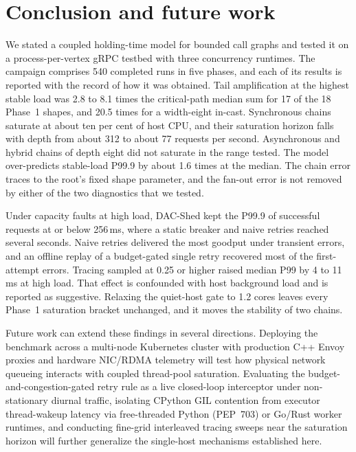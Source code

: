 \section{Conclusion and future work}
\label{sec:conclusion}

We stated a coupled holding-time model for bounded call graphs and tested it on a process-per-vertex gRPC testbed with three concurrency runtimes. The campaign comprises 540 completed runs in five phases, and each of its results is reported with the record of how it was obtained. Tail amplification at the highest stable load was 2.8 to 8.1 times the critical-path median sum for 17 of the 18 Phase~1 shapes, and 20.5 times for a width-eight in-cast. Synchronous chains saturate at about ten per cent of host CPU, and their saturation horizon falls with depth from about 312 to about 77 requests per second. Asynchronous and hybrid chains of depth eight did not saturate in the range tested. The model over-predicts stable-load P99.9 by about 1.6 times at the median. The chain error traces to the root's fixed shape parameter, and the fan-out error is not removed by either of the two diagnostics that we tested.

Under capacity faults at high load, DAC-Shed kept the P99.9 of successful requests at or below 256\,ms, where a static breaker and naive retries reached several seconds. Naive retries delivered the most goodput under transient errors, and an offline replay of a budget-gated single retry recovered most of the first-attempt errors. Tracing sampled at 0.25 or higher raised median P99 by 4 to 11\,ms at high load. That effect is confounded with host background load and is reported as suggestive. Relaxing the quiet-host gate to 1.2 cores leaves every Phase~1 saturation bracket unchanged, and it moves the stability of two chains.

Future work can extend these findings in several directions. Deploying the benchmark across a multi-node Kubernetes cluster with production C++ Envoy proxies and hardware NIC/RDMA telemetry will test how physical network queueing interacts with coupled thread-pool saturation. Evaluating the budget-and-congestion-gated retry rule as a live closed-loop interceptor under non-stationary diurnal traffic, isolating CPython GIL contention from executor thread-wakeup latency via free-threaded Python (PEP~703) or Go/Rust worker runtimes, and conducting fine-grid interleaved tracing sweeps near the saturation horizon will further generalize the single-host mechanisms established here.
